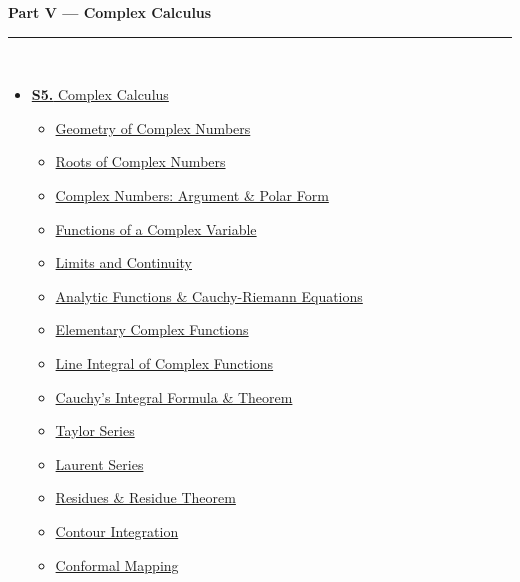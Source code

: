 \documentclass[12pt,a4paper]{article}
\begin{document}
\begin{tcolorbox}[breakable,colback=cE!5,colframe=cE,boxrule=1pt,arc=5pt,
  left=8pt,right=8pt,top=8pt,bottom=8pt,before skip=4pt]
  {\large\bfseries\textcolor{cE}{Part V --- Complex Calculus}}\\[5pt]
  \textcolor{cE!40}{\rule{\textwidth}{0.4pt}}\\[3pt]
  \small\begin{itemize}[leftmargin=1.2em,itemsep=1pt,label={\textcolor{cE}{$\triangleright$}}]
    \item \hyperref[sec:S5]{\textbf{S5.} Complex Calculus}
      \begin{itemize}[leftmargin=1.5em,itemsep=0pt,label={\textcolor{cE}{$\cdot$}}]
        \item \hyperref[sub:s5-geometry]{Geometry of Complex Numbers}
        \item \hyperref[sub:s5-roots]{Roots of Complex Numbers}
        \item \hyperref[sub:s5-complexnums]{Complex Numbers: Argument \& Polar Form}
        \item \hyperref[sub:s5-functions]{Functions of a Complex Variable}
        \item \hyperref[sub:s5-limcont]{Limits and Continuity}
        \item \hyperref[sub:s5-analytic]{Analytic Functions \& Cauchy-Riemann Equations}
        \item \hyperref[sub:s5-elementary]{Elementary Complex Functions}
        \item \hyperref[sub:s5-lineint]{Line Integral of Complex Functions}
        \item \hyperref[sub:s5-cauchy]{Cauchy's Integral Formula \& Theorem}
        \item \hyperref[sub:s5-taylor]{Taylor Series}
        \item \hyperref[sub:s5-laurent]{Laurent Series}
        \item \hyperref[sub:s5-residue]{Residues \& Residue Theorem}
        \item \hyperref[sub:s5-contour]{Contour Integration}
        \item \hyperref[sub:s5-conformal]{Conformal Mapping}
      \end{itemize}
  \end{itemize}
\end{tcolorbox}

\vspace{6pt}
\end{document}
